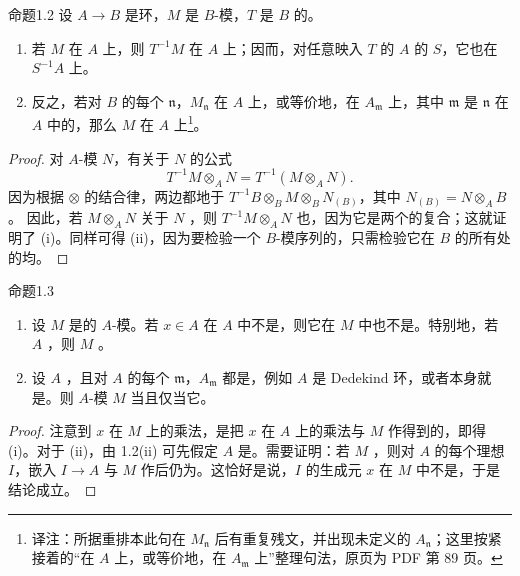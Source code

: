 \begin{SGAresult}{命题}{1.2}
设 $A\to B$ 是环，$M$ 是 $B$-模，$T$ 是 $B$ 的。
\begin{enumerate}
\item[(i)] 若 $M$ 在 $A$ 上，则 $T^{-1}M$ 在 $A$ 上；因而，对任意映入 $T$ 的 $A$ 的 $S$，它也在 $S^{-1}A$ 上。
\item[(ii)] 反之，若对 $B$ 的每个 $\mathfrak n$，$M_{\mathfrak n}$ 在 $A$ 上，或等价地，在 $A_{\mathfrak m}$ 上，其中 $\mathfrak m$ 是 $\mathfrak n$ 在 $A$ 中的，那么 $M$ 在 $A$ 上\footnote{译注：所据重排本此句在 $M_{\mathfrak n}$ 后有重复残文，并出现未定义的 $A_{\mathfrak n}$；这里按紧接着的“在 $A$ 上，或等价地，在 $A_{\mathfrak m}$ 上”整理句法，原页为 PDF 第 89 页。}。
\end{enumerate}
\end{SGAresult}
\begin{proof}
对 $A$-模 $N$，有关于 $N$ 的公式
\[
T^{-1}M\otimes_A N=T^{-1}(M\otimes_A N).
\]
因为根据 $\otimes$ 的结合律，两边都地于
$T^{-1}B\otimes_B M\otimes_B N_{(B)}$，其中 $N_{(B)}=N\otimes_A B$。
因此，若 $M\otimes_A N$ 关于 $N$ ，则 $T^{-1}M\otimes_A N$ 也，因为它是两个的复合；这就证明了 (i)。同样可得 (ii)，因为要检验一个 $B$-模序列的，只需检验它在 $B$ 的所有处的均。
\end{proof}

\begin{SGAresult}{命题}{1.3}
\begin{enumerate}
\item[(i)] 设 $M$ 是的 $A$-模。若 $x\in A$ 在 $A$ 中不是，则它在 $M$ 中也不是。特别地，若 $A$ ，则 $M$ 。
\item[(ii)] 设 $A$ ，且对 $A$ 的每个 $\mathfrak m$，$A_{\mathfrak m}$ 都是，例如 $A$ 是 Dedekind 环，或者本身就是。则 $A$-模 $M$ 当且仅当它。
\end{enumerate}
\end{SGAresult}
\begin{proof}
注意到 $x$ 在 $M$ 上的乘法，是把 $x$ 在 $A$ 上的乘法与 $M$ 作得到的，即得 (i)。对于 (ii)，由 1.2(ii) 可先假定 $A$ 是。需要证明：若 $M$ ，则对 $A$ 的每个理想 $I$，嵌入 $I\to A$ 与 $M$ 作后仍为。这恰好是说，$I$ 的生成元 $x$ 在 $M$ 中不是，于是结论成立。
\end{proof}

